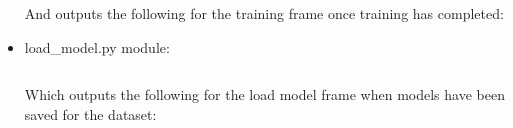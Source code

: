 \documentclass[./project-report/src/latex/project-report.tex]{subfiles}
\begin{document}
\begin{itemize}
        \pagebreak

        And outputs the following for the training frame once training has completed:

        \begin{figure}[h!]
        \centering
        \end{figure}

    \item load\_model.py module:
        \inputminted{python}{./school_project/frames/load_model.py}

        Which outputs the following for the load model frame when models have been saved for the dataset:

        \pagebreak

        \begin{figure}[h!]
        \centering
        \end{figure}


\end{itemize}
\end{document}
